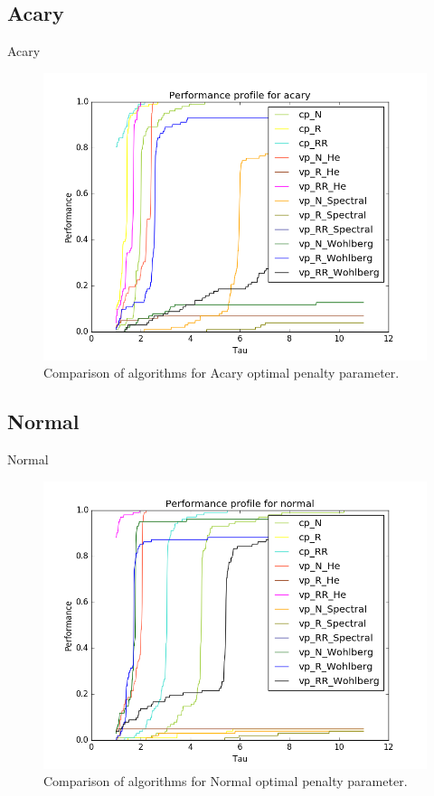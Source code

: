 \documentclass[8pt,red]{beamer}
\theoremstyle{plain}
\theoremstyle{definition}
\theoremstyle{remark}
\begin{document}
\subsection{Acary}
\begin{frame}{Acary}
\begin{figure}[hbtp]
\centering
\includegraphics[scale=0.4]{Results/Acary_mini.png}
\caption{Comparison of algorithms for Acary optimal penalty parameter.}
\end{figure}
\end{frame}

\subsection{Normal}
\begin{frame}{Normal}
\begin{figure}[hbtp]
\centering
\includegraphics[scale=0.4]{Results/Normal_mini.png}
\caption{Comparison of algorithms for Normal optimal penalty parameter.}
\end{figure}
\end{frame}
\end{document}
